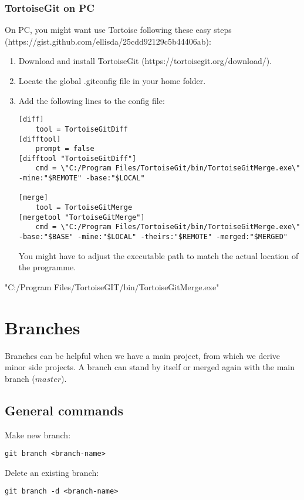\documentclass{article}
\begin{document}
\subsubsection{TortoiseGit on PC}
On PC, you might want use Tortoise following these easy steps (https://gist.github.com/ellisda/25cdd92129c5b44406ab):
\begin{enumerate}
	\item Download and install TortoiseGit (https://tortoisegit.org/download/).
	\item Locate the global .gitconfig file in your home folder.
	\item Add the following lines to the config file:
	\begin{verbatim}
[diff]
	tool = TortoiseGitDiff	
[difftool]
	prompt = false
[difftool "TortoiseGitDiff"]
	cmd = \"C:/Program Files/TortoiseGit/bin/TortoiseGitMerge.exe\" -mine:"$REMOTE" -base:"$LOCAL" 
	
[merge]
	tool = TortoiseGitMerge	
[mergetool "TortoiseGitMerge"]
	cmd = \"C:/Program Files/TortoiseGit/bin/TortoiseGitMerge.exe\" -base:"$BASE" -mine:"$LOCAL" -theirs:"$REMOTE" -merged:"$MERGED"
	\end{verbatim}
	You might have to adjust the executable path to match the actual location of the programme.
\end{enumerate}
"C:/Program Files/TortoiseGIT/bin/TortoiseGitMerge.exe"

\section{Branches}
Branches can be helpful when we have a main project, from which we derive minor side projects. A branch can stand by itself or merged again with the main branch ($master$).

\subsection{General commands}
Make new branch:
\begin{verbatim}
git branch <branch-name>
\end{verbatim}

Delete an existing branch:
\begin{verbatim}
git branch -d <branch-name>
\end{verbatim}
\end{document}
